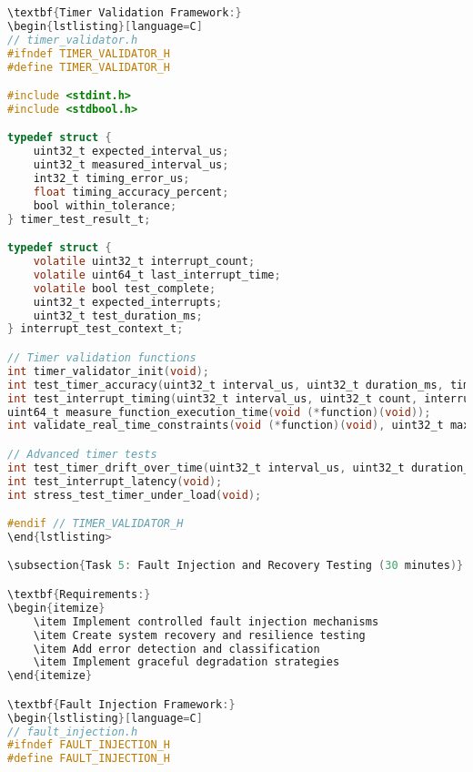 \documentclass[11pt,a4paper]{article}
\begin{document}
\begin{lstlisting}[language=C]
\textbf{Timer Validation Framework:}
\begin{lstlisting}[language=C]
// timer_validator.h
#ifndef TIMER_VALIDATOR_H
#define TIMER_VALIDATOR_H

#include <stdint.h>
#include <stdbool.h>

typedef struct {
    uint32_t expected_interval_us;
    uint32_t measured_interval_us;
    int32_t timing_error_us;
    float timing_accuracy_percent;
    bool within_tolerance;
} timer_test_result_t;

typedef struct {
    volatile uint32_t interrupt_count;
    volatile uint64_t last_interrupt_time;
    volatile bool test_complete;
    uint32_t expected_interrupts;
    uint32_t test_duration_ms;
} interrupt_test_context_t;

// Timer validation functions
int timer_validator_init(void);
int test_timer_accuracy(uint32_t interval_us, uint32_t duration_ms, timer_test_result_t* result);
int test_interrupt_timing(uint32_t interval_us, uint32_t count, interrupt_test_context_t* context);
uint64_t measure_function_execution_time(void (*function)(void));
int validate_real_time_constraints(void (*function)(void), uint32_t max_time_us);

// Advanced timer tests
int test_timer_drift_over_time(uint32_t interval_us, uint32_t duration_minutes);
int test_interrupt_latency(void);
int stress_test_timer_under_load(void);

#endif // TIMER_VALIDATOR_H
\end{lstlisting>

\subsection{Task 5: Fault Injection and Recovery Testing (30 minutes)}

\textbf{Requirements:}
\begin{itemize}
    \item Implement controlled fault injection mechanisms
    \item Create system recovery and resilience testing
    \item Add error detection and classification
    \item Implement graceful degradation strategies
\end{itemize}

\textbf{Fault Injection Framework:}
\begin{lstlisting}[language=C]
// fault_injection.h
#ifndef FAULT_INJECTION_H
#define FAULT_INJECTION_H


\end{lstlisting}
\end{document}

